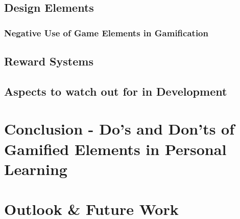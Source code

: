 \documentclass[12pt,a4paper]{report}
\begin{document}
\section{Design Elements}


\subsection{Negative Use of Game Elements in Gamification}


\section{Reward Systems}


\section{Aspects to watch out for in Development}



\chapter{Conclusion - Do's and Don'ts of Gamified Elements in Personal Learning}


\newpage


\chapter{Outlook \& Future Work}


\newpage



\newpage


\newpage



\end{document}
